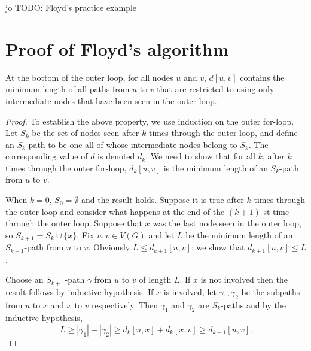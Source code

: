 \begin{Boxample}[0]
jo TODO: Floyd's practice example
\end{Boxample}

\section{Proof of Floyd's algorithm}
\begin{Theorem} \label{thm:floyd}
At the bottom of the outer  loop, for all nodes $u$ and $v$,
$d[u,v]$ contains the minimum length of all paths from $u$ to $v$ that
are restricted to using only intermediate nodes that have been seen in
the outer  loop. 
\end{Theorem}


\begin{proof}
To establish the above property, we use induction on the outer for-loop.
Let $S_k$ be the set of nodes seen after $k$ times through the
outer loop, and define an $S_k$-path  to be one all of whose
intermediate nodes belong to $S_k$. The corresponding value of $d$ is 
denoted $d_k$. We need to show that for all $k$, after $k$ times through 
the outer for-loop, $d_k[u,v]$ is the minimum length of an $S_k$-path 
from $u$ to $v$. 

When $k=0$, $S_0 = \emptyset$ and the result holds. Suppose
it is true after $k$ times through the outer loop and consider what
happens at the end of the $(k+1)$-st time through the outer loop.
Suppose that $x$ was the last node seen in the outer loop, so $S_{k+1}=
S_k \cup \{x\}$. Fix $u, v\in V(G)$ and let $L$ be the minimum length of
an $S_{k+1}$-path from $u$ to $v$. Obviously $L \leq d_{k+1}[u,v]$; we
show that $d_{k+1}[u,v] \leq L$. 

Choose an $S_{k+1}$-path $\gamma$ from $u$ to $v$ of length $L$. If $x$
is not involved then the result follows by inductive hypothesis. If $x$
is involved, let $\gamma_1, \gamma_2$ be the subpaths from $u$ to $x$
and $x$ to $v$ respectively. Then $\gamma_1$ and $\gamma_2$ are
$S_k$-paths and by the inductive hypothesis, $$L \geq |\gamma_1| +
|\gamma_2| \geq d_k[u,x] + d_k[x,v] \geq d_{k+1}[u,v]\text{.}$$
\end{proof}


